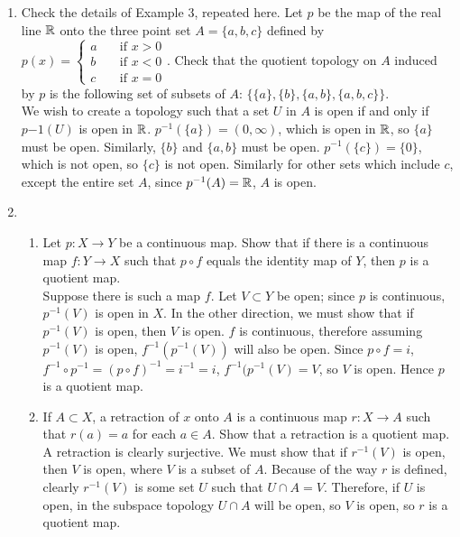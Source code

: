 \documentclass[12pt,letterpaper]{article}
\begin{document}
\RaggedRight
\begin{enumerate}
  \item Check the details of Example 3, repeated here. Let $p$ be the map of the real line $\mathbb{R}$ onto the three point set $A=\{a,b,c\}$ defined by $p(x)=\begin{cases} a &\quad \text{if } x>0 \\ b &\quad \text{if } x<0 \\ c &\quad \text{if } x=0 \end{cases}$. Check that the quotient topology on $A$ induced by $p$ is the following set of subsets of $A$: $\{\{a\},\{b\},\{a,b\},\{a,b,c\}\}$. \\
  We wish to create a topology such that a set $U$ in $A$ is open if and only if $p{-1}(U)$ is open in $\mathbb{R}$. $p^{-1}(\{a\}) = (0,\infty)$, which is open in $\mathbb{R}$, so $\{a\}$ must be open. Similarly, $\{b\}$ and $\{a,b\}$ must be open. $p^{-1}(\{c\}) = \{0\}$, which is not open, so $\{c\}$ is not open. Similarly for other sets which include $c$, except the entire set $A$, since $p^{-1}(A)=\mathbb{R}$, $A$ is open. 
  \item \begin{enumerate}
    \item Let $p: X\rightarrow Y$ be a continuous map. Show that if there is a continuous map $f: Y\rightarrow X$ such that $p\circ f$ equals the identity map of $Y$, then $p$ is a quotient map. \\
    Suppose there is such a map $f$. Let $V\subset Y$ be open; since $p$ is continuous, $p^{-1}(V)$ is open in $X$. In the other direction, we must show that if $p^{-1}(V)$ is open, then $V$ is open. $f$ is continuous, therefore assuming $p^{-1}(V)$ is open, $f^{-1}(p^{-1}(V))$ will also be open. Since $p\circ f = i$, $f^{-1}\circ p^{-1} = (p\circ f)^{-1} = i^{-1} = i$, $f^{-1}(p^{-1}(V) = V$, so $V$ is open. Hence $p$ is a quotient map.
    \item If $A \subset X$, a retraction of $x$ onto $A$ is a continuous map $r: X\rightarrow A$ such that $r(a)=a$ for each $a\in A$. Show that a retraction is a quotient map. \\
    A retraction is clearly surjective. %
    We must show that if $r^{-1}(V)$ is open, then $V$ is open, where $V$ is a subset of $A$. Because of the way $r$ is defined, clearly $r^{-1}(V)$ is some set $U$ such that $U\cap A = V$. Therefore, if $U$ is open, in the subspace topology $U\cap A$ will be open, so $V$ is open, so $r$ is a quotient map.

\end{enumerate}
\end{enumerate}
\end{document}
